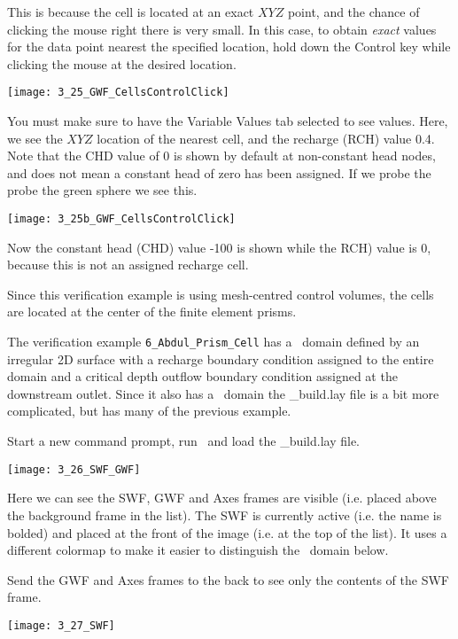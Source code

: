 This is because the cell is located at an exact $XYZ$ point, and the chance of clicking the mouse right there is very small.  In this case, to obtain {\it exact} values for the data point nearest the specified location, hold down the {\sf Control} key while clicking the mouse at the desired location.

       \texttt{[image: 3\_25\_GWF\_CellsControlClick]}

You must make sure to have the {\sf Variable Values} tab selected to see values. Here, we see the $XYZ$ location of the nearest cell, and the recharge ({\sf RCH}) value 0.4.  Note that the {\sf CHD} value of 0 is shown by default at non-constant head nodes, and does not mean a constant head of zero has been assigned.   If we probe the probe the green sphere we see this. 

       \texttt{[image: 3\_25b\_GWF\_CellsControlClick]}

Now the constant head ({\sf CHD}) value -100 is shown while the {\sf RCH}) value is 0, because this is not an assigned recharge cell.

Since this verification example is using mesh-centred control volumes, the cells are located at the center of the finite element prisms.

The verification example \texttt{6\_Abdul\_Prism\_Cell} has a \swf\ domain defined by an irregular 2D surface with a recharge boundary condition assigned to the entire domain and a critical depth outflow boundary condition assigned at the downstream outlet. Since it also has a \gwf\ domain the {\sf \_build.lay} file is a bit more complicated, but has many of the previous example. 

Start a new command prompt, run \tecplot\ and load the {\sf \_build.lay} file.

        \texttt{[image: 3\_26\_SWF\_GWF]}
        
Here we can see the {\sf SWF, GWF} and {\sf Axes} frames are visible (i.e. placed above the {\sf background} frame in the list).  The {\sf SWF} is currently active (i.e. the name is bolded) and placed at the front of the image (i.e. at the top of the list). It uses a different colormap to make it easier to distinguish the \gwf\ domain below.  

Send the {\sf GWF} and {\sf Axes} frames to the back to see only the contents of the {\sf SWF} frame.

        \texttt{[image: 3\_27\_SWF]}
        


